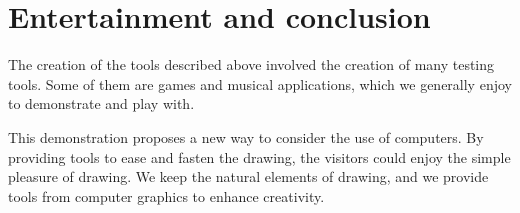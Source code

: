 \documentclass{article}
\begin{document}
\section{Entertainment and conclusion}
The creation of the tools described above involved the creation of many testing tools. Some of them are games and musical applications, which we generally enjoy to demonstrate and play with. 

This demonstration proposes a new way to consider the use of computers. By providing tools to ease and fasten the drawing, the visitors could enjoy the simple pleasure of drawing. We keep the natural elements of drawing, and we provide tools from computer graphics to enhance creativity.



\end{document}
